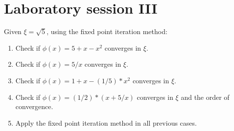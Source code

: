 \documentclass[12pt, a4paper]{report}
\newtheorem[style=M,bodystyle=\normalfont]{theorem}{Theorem}
\newtheorem[style=M,bodystyle=\normalfont]{corollary}{Corollary}
\newtheorem[style=M,bodystyle=\normalfont]{lemma}{Lemma}
\newtheorem[style=M,bodystyle=\normalfont]{definition}{Definition}
\begin{document}
\newpage

\chapter{Laboratory session III}
    \begin{Exercise}[label=10]
        Given $\xi=\sqrt{5}$, using the fixed point iteration method: 
        \begin{enumerate}
            \item Check if $\phi(x)=5+x-x^2$ converges in $\xi$.
            \item Check if $\phi(x)=5/x$ converges in $\xi$.
            \item Check if $\phi(x)=1+x-(1/5)*x^2$ converges in $\xi$.
            \item Check if $\phi(x)=(1/2)*(x + 5/x)$ converges in $\xi$ and the order of convergence. 
            \item Apply the fixed point iteration method in all previous cases. 
        \end{enumerate}
    \end{Exercise}
\end{document}

